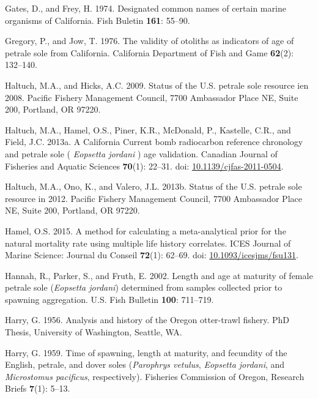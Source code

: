 \documentclass[12pt,]{article}
\begin{document}
\hypertarget{ref-gates_designated_1974}{}
Gates, D., and Frey, H. 1974. Designated common names of certain marine
organisms of California. Fish Buletin \textbf{161}: 55--90.

\hypertarget{ref-gregory_validity_1976}{}
Gregory, P., and Jow, T. 1976. The validity of otoliths as indicators of
age of petrale sole from California. California Department of Fish and
Game \textbf{62}(2): 132--140.

\hypertarget{ref-haltuch_status_2009}{}
Haltuch, M.A., and Hicks, A.C. 2009. Status of the U.S. petrale sole
resource ien 2008. Pacific Fishery Management Council, 7700 Ambassador
Place NE, Suite 200, Portland, OR 97220.

\hypertarget{ref-haltuch_california_2013}{}
Haltuch, M.A., Hamel, O.S., Piner, K.R., McDonald, P., Kastelle, C.R.,
and Field, J.C. 2013a. A California Current bomb radiocarbon reference
chronology and petrale sole ( \emph{Eopsetta jordani} ) age validation.
Canadian Journal of Fisheries and Aquatic Sciences \textbf{70}(1):
22--31. doi:
\href{https://doi.org/10.1139/cjfas-2011-0504}{10.1139/cjfas-2011-0504}.

\hypertarget{ref-haltuch_status_2013}{}
Haltuch, M.A., Ono, K., and Valero, J.L. 2013b. Status of the U.S.
petrale sole resource in 2012. Pacific Fishery Management Council, 7700
Ambassador Place NE, Suite 200, Portland, OR 97220.

\hypertarget{ref-hamel_method_2015}{}
Hamel, O.S. 2015. A method for calculating a meta-analytical prior for
the natural mortality rate using multiple life history correlates. ICES
Journal of Marine Science: Journal du Conseil \textbf{72}(1): 62--69.
doi:
\href{https://doi.org/10.1093/icesjms/fsu131}{10.1093/icesjms/fsu131}.

\hypertarget{ref-hannah_length_2002}{}
Hannah, R., Parker, S., and Fruth, E. 2002. Length and age at maturity
of female petrale sole (\emph{Eopsetta jordani}) determined from samples
collected prior to spawning aggregation. U.S. Fish Bulletin
\textbf{100}: 711--719.

\hypertarget{ref-harry_analysis_1956}{}
Harry, G. 1956. Analysis and history of the Oregon otter-trawl fishery.
PhD Thesis, University of Washington, Seattle, WA.

\hypertarget{ref-harry_time_1959}{}
Harry, G. 1959. Time of spawning, length at maturity, and fecundity of
the English, petrale, and dover soles (\emph{Parophrys vetulus},
\emph{Eopsetta jordani}, and \emph{Microstomus pacificus},
respectively). Fisheries Commission of Oregon, Research Briefs
\textbf{7}(1): 5--13.
\end{document}
